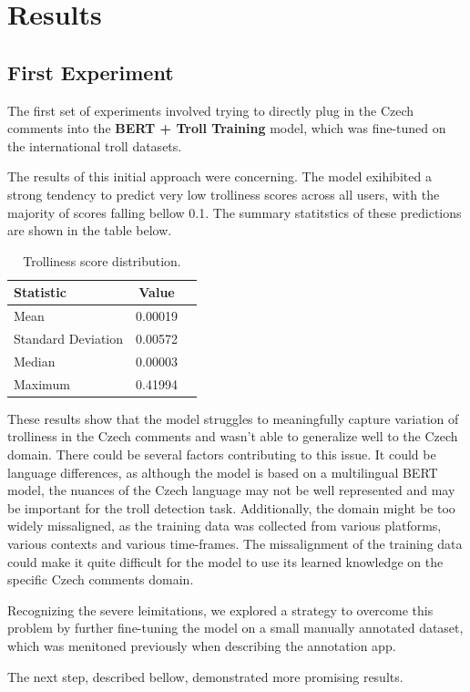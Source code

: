 \documentclass[twoside]{ctuthesis}
\theoremstyle{plain}
\theoremstyle{definition}
\theoremstyle{note}
\begin{document}
\section{Results}

\subsection{First Experiment}
The first set of experiments involved trying to directly plug in the Czech comments into the \textbf{BERT + Troll Training} model, which was fine-tuned on the international troll datasets.\par
The results of this initial approach were concerning. The model exihibited a strong tendency to predict very low trolliness scores across all users, with the majority of scores falling bellow 0.1. The summary statitstics of these predictions are shown in the table below.

\begin{table}[ht]
    \centering
    \caption{Trolliness score distribution.}
    \begin{tabular}{lcc}
        \toprule
        \textbf{Statistic} & \textbf{Value} \\
        \midrule
        Mean            & 0.00019  \\
        Standard Deviation & 0.00572 \\
        Median     & 0.00003  \\
        Maximum & 0.41994  \\
        \bottomrule
    \end{tabular}
\end{table}

These results show that the model struggles to meaningfully capture variation of trolliness in the Czech comments and wasn't able to generalize well to the Czech domain. There could be several factors contributing to this issue. It could be language differences, as although the model is based on a multilingual BERT model, the nuances of the Czech language may not be well represented and may be important for the troll detection task. Additionally, the domain might be too widely missaligned, as the training data was collected from various platforms, various contexts and various time-frames. The missalignment of the training data could make it quite difficult for the model to use its learned knowledge on the specific Czech comments domain.\par 
Recognizing the severe leimitations, we explored a strategy to overcome this problem by further fine-tuning the model on a small manually annotated dataset, which was menitoned previously when describing the annotation app.\par
The next step, described bellow, demonstrated more promising results.\par
\end{document}
